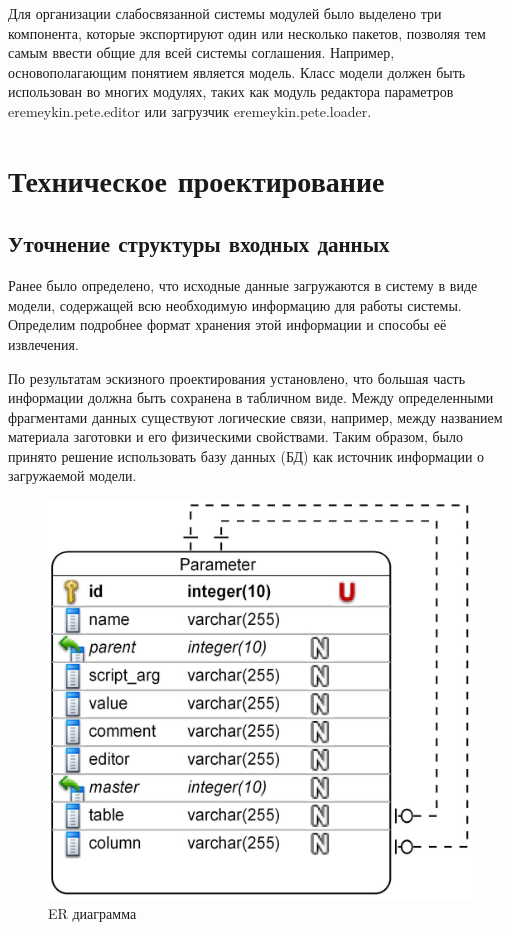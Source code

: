\documentclass[14pt,oneside,final]{extreport}
\begin{document}
	Для организации слабосвязанной системы модулей было выделено три компонента, которые  экспортируют один или несколько пакетов, позволяя тем самым ввести общие для всей системы соглашения. Например, основополагающим понятием является модель. Класс модели должен быть использован во многих модулях, таких как модуль редактора параметров eremeykin.pete.editor или загрузчик eremeykin.pete.loader.  
	
	\chapter{Техническое проектирование}
	\section{Уточнение структуры входных данных}
	Ранее было определено, что исходные данные загружаются в систему в виде модели, содержащей всю необходимую информацию для работы системы. Определим подробнее формат хранения этой информации и способы её извлечения. 
	
	По результатам эскизного проектирования установлено, что большая часть информации должна быть сохранена в табличном виде. Между определенными фрагментами данных существуют логические связи, например, между названием материала заготовки и его физическими свойствами. Таким образом, было принято решение  использовать базу данных (БД) как источник информации о загружаемой модели. 
		
	\begin{figure}[h!]
		\begin{center}
			\includegraphics[scale=0.2]{img/ER-diagram} 
		\end{center}
		\caption{ER диаграмма}
		\label{fig:er-diagram}
	\end{figure}
		
\end{document}

